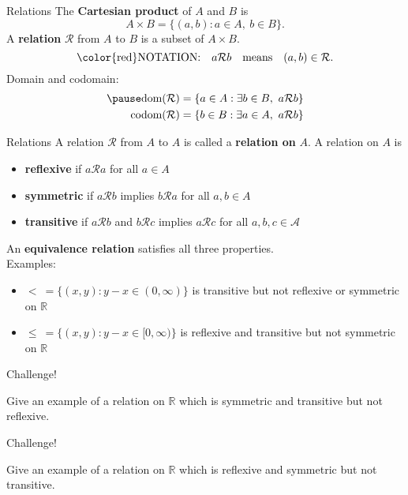 \documentclass{beamer}
\begin{document}
\begin{frame}{Relations}
The \textbf{Cartesian product} of $A$ and $B$ is
$$A\times B = \{(a,b): a\in A,\ b\in B\}.$$
\pause
A \textbf{relation} $\mathcal R$ from $A$ to $B$ is a subset of $A\times B$.\\
\pause
$$\text{\color{red}NOTATION:}\quad a\mathcal R b\quad\text{means}\quad (a,b)\in \mathcal R.$$
\pause
Domain and codomain:
\pause
\begin{align*}
\pause
\text{dom}(\mathcal{R}) &= \{a\in A: \exists b\in B,\ a\mathcal R b\}\\
\text{codom}(\mathcal{R}) &= \{b\in B: \exists a\in A,\ a\mathcal R b\}
\end{align*}
\end{frame}

\begin{frame}{Relations}
A relation $\mathcal R$ from $A$ to $A$ is called a \textbf{relation on} $A$.  A relation on $A$ is
\begin{itemize}
\pause
\item \textbf{reflexive} if $a\mathcal Ra$ for all $a\in A$
\pause
\item \textbf{symmetric} if $a\mathcal Rb$ implies $b\mathcal Ra$ for all $a,b\in A$
\pause
\item \textbf{transitive} if $a\mathcal Rb$ and $b\mathcal Rc$ implies $a\mathcal Rc$ for all $a,b,c\in\mathcal A$
\end{itemize}
\pause
An \textbf{equivalence relation} satisfies all three properties.\\
\pause
Examples:
\pause
\begin{itemize}
\pause
\item $<\ = \{(x,y): y-x\in (0,\infty)\}$ is transitive but not reflexive or symmetric on $\mathbb{R}$
\pause
\item $\leq\ = \{(x,y): y-x\in [0,\infty)\}$ is reflexive and transitive but not symmetric on $\mathbb{R}$
\end{itemize}
\end{frame}

\begin{frame}{Challenge!}
\begin{prob}
Give an example of a relation on $\mathbb{R}$ which is symmetric and transitive but not reflexive.
\end{prob}
\end{frame}

\begin{frame}{Challenge!}
\begin{prob}
Give an example of a relation on $\mathbb{R}$ which is reflexive and symmetric but not transitive.
\end{prob}
\end{frame}
\end{document}
